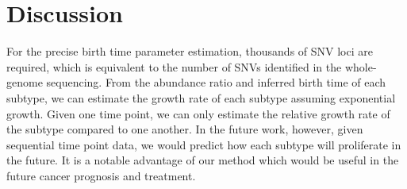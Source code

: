 \documentclass[12pt]{article}
\begin{document}
\section{Discussion}
For the precise birth time parameter estimation, thousands of SNV loci are required, which is equivalent to the number of SNVs identified in the whole-genome sequencing. From the abundance ratio and inferred birth time of each subtype, we can estimate the growth rate of each subtype assuming exponential growth. Given one time point, we can only estimate the relative growth rate of the subtype compared to one another. In the future work, however, given sequential time point data, we would predict how each subtype will proliferate in the future. It is a notable advantage of our method which would be useful in the future cancer prognosis and treatment.


\end{document}
